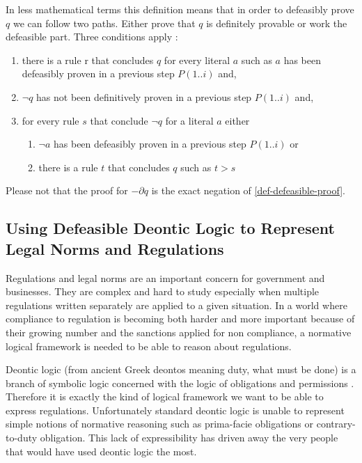 \documentclass[10pt]{report}
\newcommand{\textgreek}[1]{\begingroup\fontencoding{LGR}\selectfont#1\endgroup} %
\begin{document}
In less mathematical terms this definition means that in order to defeasibly prove $q$ we can follow two paths. Either prove that $q$ is definitely provable or work the defeasible part. Three conditions apply :
\begin{enumerate}
\item there is a rule r that concludes $q$ for every literal $a$ such as $a$ has been defeasibly proven in a previous step $P(1..i)$ and,
\item $\neg q$ has not been definitively proven in a previous step $P(1..i)$ and,
\item for every rule $s$ that conclude $\neg q$ for a literal $a$ either
  \begin{enumerate}
  \item $\neg a$ has been defeasibly proven in a previous step $P(1..i)$ or
  \item there is a rule $t$ that concludes $q$ such as $t>s$
  \end{enumerate}
\end{enumerate}

Please not that the proof for $-\partial q$ is the exact negation of \ref{def-defeasible-proof}.

\subsection{Using Defeasible Deontic Logic to Represent Legal Norms and Regulations}

Regulations and legal norms are an important concern for government and businesses. They are complex and hard to study especially when multiple regulations written separately are applied to a given situation. In a world where compliance to regulation is becoming both harder and more important because of their growing number and the sanctions applied for non compliance, a normative logical framework is needed to be able to reason about regulations.

Deontic logic (from ancient Greek \textgreek{deontos} meaning duty, what must be done) is a branch of symbolic logic concerned with the logic of obligations and permissions \autocite{mcnamara_deontic_2010}. Therefore it is exactly the kind of logical framework we want to be able to express regulations. Unfortunately standard deontic logic is unable to represent simple notions of normative reasoning such as prima-facie obligations or contrary-to-duty obligation. This lack of expressibility has driven away the very people that would have used deontic logic the most\autocite{nute1997defeasible}.
\end{document}
